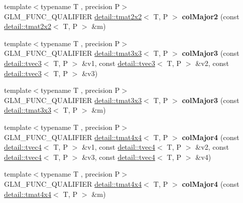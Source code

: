 \begin{DoxyCompactItemize}
\item 
{\footnotesize template$<$typename T , precision P$>$ }\\G\+L\+M\+\_\+\+F\+U\+N\+C\+\_\+\+Q\+U\+A\+L\+I\+F\+I\+ER \hyperlink{structglm_1_1detail_1_1tmat2x2}{detail\+::tmat2x2}$<$ T, P $>$ {\bfseries col\+Major2} (const \hyperlink{structglm_1_1detail_1_1tmat2x2}{detail\+::tmat2x2}$<$ T, P $>$ \&m)\hypertarget{namespaceglm_a9222461d84944a56da078d1e6efc18b3}{}\label{namespaceglm_a9222461d84944a56da078d1e6efc18b3}

\item 
{\footnotesize template$<$typename T , precision P$>$ }\\G\+L\+M\+\_\+\+F\+U\+N\+C\+\_\+\+Q\+U\+A\+L\+I\+F\+I\+ER \hyperlink{structglm_1_1detail_1_1tmat3x3}{detail\+::tmat3x3}$<$ T, P $>$ {\bfseries col\+Major3} (const \hyperlink{structglm_1_1detail_1_1tvec3}{detail\+::tvec3}$<$ T, P $>$ \&v1, const \hyperlink{structglm_1_1detail_1_1tvec3}{detail\+::tvec3}$<$ T, P $>$ \&v2, const \hyperlink{structglm_1_1detail_1_1tvec3}{detail\+::tvec3}$<$ T, P $>$ \&v3)\hypertarget{namespaceglm_a39022758eb60af2d30f1c22427d381f6}{}\label{namespaceglm_a39022758eb60af2d30f1c22427d381f6}

\item 
{\footnotesize template$<$typename T , precision P$>$ }\\G\+L\+M\+\_\+\+F\+U\+N\+C\+\_\+\+Q\+U\+A\+L\+I\+F\+I\+ER \hyperlink{structglm_1_1detail_1_1tmat3x3}{detail\+::tmat3x3}$<$ T, P $>$ {\bfseries col\+Major3} (const \hyperlink{structglm_1_1detail_1_1tmat3x3}{detail\+::tmat3x3}$<$ T, P $>$ \&m)\hypertarget{namespaceglm_a7c177048f88e541908406701962bf4c3}{}\label{namespaceglm_a7c177048f88e541908406701962bf4c3}

\item 
{\footnotesize template$<$typename T , precision P$>$ }\\G\+L\+M\+\_\+\+F\+U\+N\+C\+\_\+\+Q\+U\+A\+L\+I\+F\+I\+ER \hyperlink{structglm_1_1detail_1_1tmat4x4}{detail\+::tmat4x4}$<$ T, P $>$ {\bfseries col\+Major4} (const \hyperlink{structglm_1_1detail_1_1tvec4}{detail\+::tvec4}$<$ T, P $>$ \&v1, const \hyperlink{structglm_1_1detail_1_1tvec4}{detail\+::tvec4}$<$ T, P $>$ \&v2, const \hyperlink{structglm_1_1detail_1_1tvec4}{detail\+::tvec4}$<$ T, P $>$ \&v3, const \hyperlink{structglm_1_1detail_1_1tvec4}{detail\+::tvec4}$<$ T, P $>$ \&v4)\hypertarget{namespaceglm_accb776c979420f540987b8b9e1c92c75}{}\label{namespaceglm_accb776c979420f540987b8b9e1c92c75}

\item 
{\footnotesize template$<$typename T , precision P$>$ }\\G\+L\+M\+\_\+\+F\+U\+N\+C\+\_\+\+Q\+U\+A\+L\+I\+F\+I\+ER \hyperlink{structglm_1_1detail_1_1tmat4x4}{detail\+::tmat4x4}$<$ T, P $>$ {\bfseries col\+Major4} (const \hyperlink{structglm_1_1detail_1_1tmat4x4}{detail\+::tmat4x4}$<$ T, P $>$ \&m)\hypertarget{namespaceglm_afdcee83bf730a247cf142ac3237f993e}{}\label{namespaceglm_afdcee83bf730a247cf142ac3237f993e}


\end{DoxyCompactItemize}
